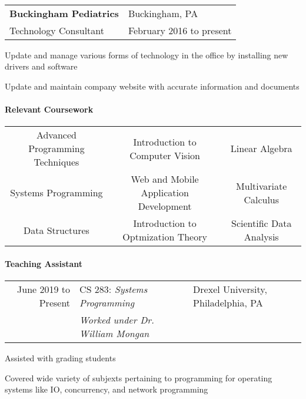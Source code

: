 \documentclass[10pt,]{article}
\let\oldparagraph\paragraph
\renewcommand{\paragraph}[1]{\oldparagraph{#1}\mbox{}}
\begin{document}
~

\begin{tabularx}{\textwidth}{l X}
    \textbf{Buckingham Pediatrics} & \hfill Buckingham, PA\\
    Technology Consultant          & \hfill February 2016 to present
\end{tabularx}

\begin{list}{\quad}{}
    \item Update and manage various forms of technology in the office by installing new drivers and software
    \item Update and maintain company website with accurate information and documents
\end{list}

\hypertarget{relevant-coursework}{%
\paragraph{Relevant Coursework}\label{relevant-coursework}}

\begin{center}
    \begin{tabularx}{\textwidth}{ccc}
        Advanced Programming Techniques & Introduction to Computer Vision & Linear Algebra\\
        Systems Programming & Web and Mobile Application Development & Multivariate Calculus\\
        Data Structures & Introduction to Optmization Theory & Scientific Data Analysis \\
    \end{tabularx}
\end{center}

\hypertarget{teaching-assistant}{%
\paragraph{Teaching Assistant}\label{teaching-assistant}}

\begin{tabularx}{\textwidth}{r | l X}
June 2019 to Present & CS 283: \textit{Systems Programming} & \hfill Drexel University, Philadelphia, PA\\
           & \textit{Worked under Dr. William Mongan}
\end{tabularx}
\begin{list}{\quad}
    \item Assisted with grading students
    \item Covered wide variety of subjexts pertaining to programming for operating systems like IO, concurrency, and network programming
\end{list}
\end{document}
